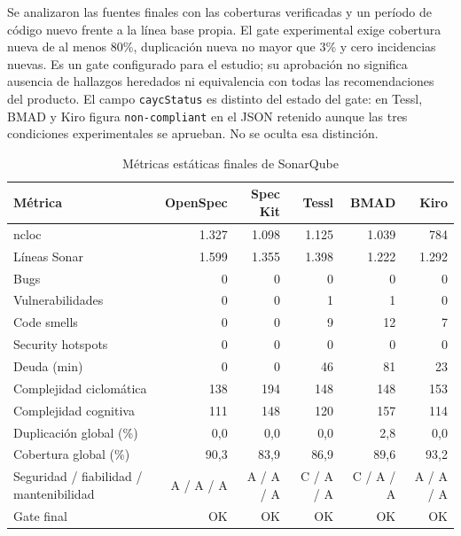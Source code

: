 Se analizaron las fuentes finales con las coberturas verificadas y un período de código nuevo frente a la línea base propia. El gate experimental exige cobertura nueva de al menos 80\%, duplicación nueva no mayor que 3\% y cero incidencias nuevas. Es un gate configurado para el estudio; su aprobación no significa ausencia de hallazgos heredados ni equivalencia con todas las recomendaciones del producto. El campo \texttt{caycStatus} es distinto del estado del gate: en Tessl, BMAD y Kiro figura \texttt{non-compliant} en el JSON retenido aunque las tres condiciones experimentales se aprueban. No se oculta esa distinción.

\begin{table}[H]\centering\small\setlength{\tabcolsep}{4pt}\renewcommand{\arraystretch}{1.06}
\caption{Métricas estáticas finales de SonarQube}
\label{tab:sonar_tetris_e2}
\begin{tabularx}{\textwidth}{Y r r r r r}\toprule

\textbf{Métrica} & \textbf{OpenSpec} & \textbf{Spec Kit} & \textbf{Tessl} & \textbf{BMAD} & \textbf{Kiro} \\ \midrule

ncloc & 1.327 & 1.098 & 1.125 & 1.039 & 784 \\

Líneas Sonar & 1.599 & 1.355 & 1.398 & 1.222 & 1.292 \\

Bugs & 0 & 0 & 0 & 0 & 0 \\

Vulnerabilidades & 0 & 0 & 1 & 1 & 0 \\

Code smells & 0 & 0 & 9 & 12 & 7 \\

Security hotspots & 0 & 0 & 0 & 0 & 0 \\

Deuda (min) & 0 & 0 & 46 & 81 & 23 \\

Complejidad ciclomática & 138 & 194 & 148 & 148 & 153 \\

Complejidad cognitiva & 111 & 148 & 120 & 157 & 114 \\

Duplicación global (\%) & 0,0 & 0,0 & 0,0 & 2,8 & 0,0 \\

Cobertura global (\%) & 90,3 & 83,9 & 86,9 & 89,6 & 93,2 \\

Seguridad / fiabilidad / mantenibilidad & A / A / A & A / A / A & C / A / A & C / A / A & A / A / A \\

Gate final & OK & OK & OK & OK & OK \\

\bottomrule\end{tabularx}

\end{table}

